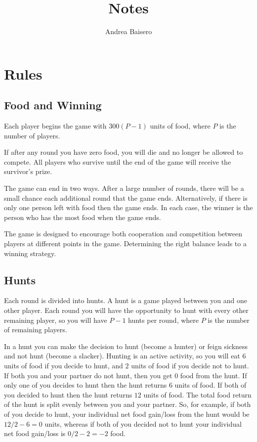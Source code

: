 \documentclass[10pt,fleqn]{article}
\title{Notes}
\author{Andrea Baisero}
\begin{document}
\maketitle

\section{Rules}

\subsection{Food and Winning}

Each player begins the game with $300(P-1)$ units of food, where $P$ is the
number of players.

If after any round you have zero food, you will die and no longer be allowed to
compete. All players who survive until the end of the game will receive the
survivor's prize.

The game can end in two ways. After a large number of rounds, there will be a
small chance each additional round that the game ends. Alternatively, if there
is only one person left with food then the game ends. In each case, the winner
is the person who has the most food when the game ends.

The game is designed to encourage both cooperation and competition between
players at different points in the game. Determining the right balance leads to
a winning strategy.

\subsection{Hunts}

Each round is divided into hunts. A hunt is a game played between you and one
other player. Each round you will have the opportunity to hunt with every other
remaining player, so you will have $P-1$ hunts per round, where $P$ is the
number of remaining players.

In a hunt you can make the decision to hunt (become a hunter) or feign sickness
and not hunt (become a slacker). Hunting is an active activity, so you will eat
$6$ units of food if you decide to hunt, and $2$ units of food if you decide not
to hunt. If both you and your partner do not hunt, then you get $0$ food from
the hunt. If only one of you decides to hunt then the hunt returns $6$ units of
food.  If both of you decided to hunt then the hunt returns $12$ units of food.
The total food return of the hunt is split evenly between you and your partner.
So, for example, if both of you decide to hunt, your individual net food
gain/loss from the hunt would be $12/2 - 6=0$ units, whereas if both of you
decided not to hunt your individual net food gain/loss is $0/2 - 2= -2$ food.
\end{document}
